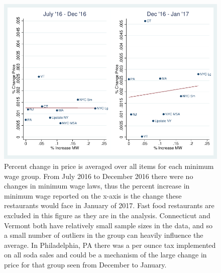 \documentclass[11pt]{article}
\begin{document}
\begin{figure}
\centering
\includegraphics[scale=1]{yelp_scatter_lfit.pdf}
\caption[Short Heading]{
Percent change in price is averaged over all items for each minimum wage group. From July 2016 to December 2016 there were no changes in minimum wage laws, thus the percent increase in minimum wage reported on the x-axis is the change these restaurants would face in January of 2017. Fast food restaurants are excluded in this figure as they are in the analysis. Connecticut and Vermont both have relatively small sample sizes in the data, and so a small number of outliers in the group can heavily influence the average. In Philadelphia, PA there was a per ounce tax implemented on all soda sales and could be a mechanism of the large change in price for that group seen from December to January. 
}
\end{figure}
\end{document}
